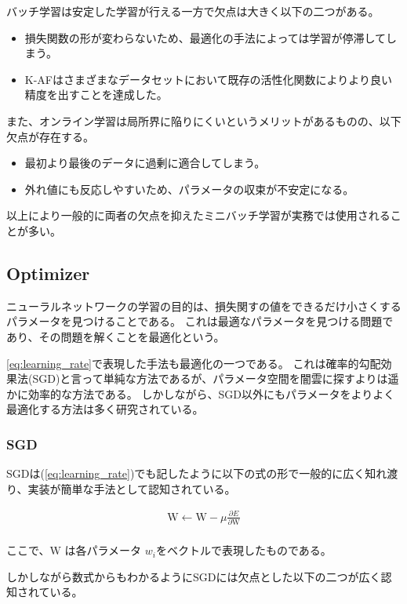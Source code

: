 バッチ学習は安定した学習が行える一方で欠点は大きく以下の二つがある。

\begin{itemize}
  \item 損失関数の形が変わらないため、最適化の手法によっては学習が停滞してしまう。
  \item K-AFはさまざまなデータセットにおいて既存の活性化関数によりより良い精度を出すことを達成した。
\end{itemize}

また、オンライン学習は局所界に陥りにくいというメリットがあるものの、以下欠点が存在する。

\begin{itemize}
  \item 最初より最後のデータに過剰に適合してしまう。
  \item 外れ値にも反応しやすいため、パラメータの収束が不安定になる。
\end{itemize}

以上により一般的に両者の欠点を抑えたミニバッチ学習が実務では使用されることが多い。


\subsection{Optimizer}
ニューラルネットワークの学習の目的は、損失関すの値をできるだけ小さくするパラメータを見つけることである。
これは最適なパラメータを見つける問題であり、その問題を解くことを最適化という。

\ref{eq:learning_rate}で表現した手法も最適化の一つである。
これは確率的勾配効果法(SGD)と言って単純な方法であるが、パラメータ空間を闇雲に探すよりは遥かに効率的な方法である。
しかしながら、SGD以外にもパラメータをよりよく最適化する方法は多く研究されている。

\subsubsection{SGD}
SGDは(\ref{eq:learning_rate})でも記したように以下の式の形で一般的に広く知れ渡り、実装が簡単な手法として認知されている。

\begin{eqnarray}
\mathrm{W} \leftarrow \mathrm{W} - \mu \frac{\partial E}{\partial \mathrm{W}} \\
\label{eq:sgd}
\end{eqnarray}

ここで、$ \mathrm{W} $ は各パラメータ $ w_i $をベクトルで表現したものである。

しかしながら数式からもわかるようにSGDには欠点とした以下の二つが広く認知されている。




